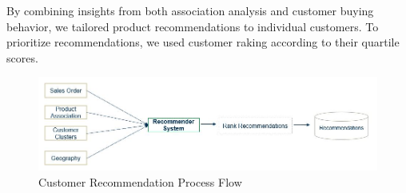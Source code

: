\documentclass[11pt]{article} %
\begin{document}
By combining insights from both association analysis and customer buying behavior, we tailored product recommendations to individual customers. To prioritize recommendations, we used customer raking according to their quartile scores.
\begin{figure}[H]
    \centering
    \includegraphics[scale=0.7]{images/customer_recommendation_methods.JPG}
    \caption{Customer Recommendation Process Flow}
    \label{fig:customer_recommendation_methods}
\end{figure}
\clearpage
\end{document}
